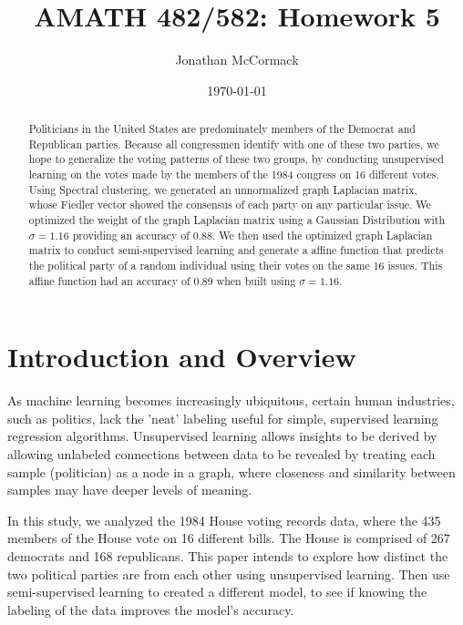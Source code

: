 \documentclass[11pt]{amsart}
\title{AMATH 482/582: Homework 5}
\author{Jonathan McCormack}
\date{\today}
\begin{document}
\begin{abstract}
    Politicians in the United States are predominately members of the Democrat and Republican parties. 
    Because all congressmen identify with one of these two parties, we hope to generalize the voting patterns 
    of these two groups, by conducting unsupervised learning on the votes made by the members of the 1984 congress on 
    16 different votes. Using Spectral clustering, we generated an unnormalized graph Laplacian matrix, whose Fiedler vector 
    showed the consensus of each party on any particular issue. We optimized the weight of the graph Laplacian matrix 
    using a Gaussian Distribution with $\sigma = 1.16$ providing an accuracy of 0.88. We then used the optimized graph Laplacian 
    matrix to conduct semi-supervised learning and generate a affine function that predicts the political party of 
    a random individual using their votes on the same 16 issues. This affine function had an accuracy of 0.89 when built using $\sigma = 1.16$.

\end{abstract}

\maketitle 

\section{Introduction and Overview}\label{sec:Introduction}

As machine learning becomes increasingly ubiquitous, certain human industries, such as politics, lack the 'neat' labeling 
useful for simple, supervised learning regression algorithms. Unsupervised learning allows insights to be derived by allowing 
unlabeled connections between data to be revealed by treating each sample (politician) as a node in a graph, where closeness and 
similarity between samples may have deeper levels of meaning. 

In this study, we analyzed the 1984 House voting records data, where the 435 members of the House vote on 16 different bills. 
The House is comprised of 267 democrats and 168 republicans. This paper intends to explore how distinct the two political parties 
are from each other using unsupervised learning. Then use semi-supervised learning to created a different model, to see if knowing 
the labeling of the data improves the model's accuracy. 
\end{document}
